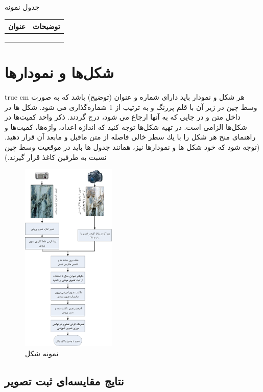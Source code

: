 \documentclass[11pt, twoside]{imsproc}
\begin{document}
\begin{center}
\par
\begingroup%
  \makeatletter
  \def\@captype{table}%
  \makeatother
  \caption{جدول نمونه }%
\endgroup%
\begin{tabular}{|c|p{2in}|} 
\hline عنوان & توضیحات \\ 
\hline  &  \\ 
\hline  &  \\ 
\hline  &  \\ 
\hline 
\end{tabular} 
\end{center}
\section{شكل‌ها و نمودارها}
 true cm
هر شكل و نمودار بايد دارای شماره و عنوان (توضيح) باشد كه به صورت وسط چين در زير آن با قلم پررنگ  و به ترتيب از 1 شماره‌گذاری می شود. شكل ‌ها در داخل متن و در جايی كه به آنها ارجاع می شود، درج گردند. ذكر واحد كميت‌ها در شكل‌ها الزامی است. در تهيه شكل‌ها توجه كنيد كه اندازه اعداد، واژه‌ها، كميت‌ها و راهنمای منح هر شكل را با يك سطر خالی فاصله از متن ماقبل و مابعد آن قرار دهيد. (توجه شود كه خود شكل ها و نمودارها نيز، همانند جدول ها بايد در موقعيت وسط چين نسبت به طرفين كاغذ قرار گيرند.)
\\
\begin{figure}[ht]
\centering
\includegraphics[width=45mm]{Fig-1} 
\caption{\label{shir}\small نمونه شكل }
\end{figure}

\subsection{نتایج مقایسه‌ای ثبت تصویر}
\end{document}
